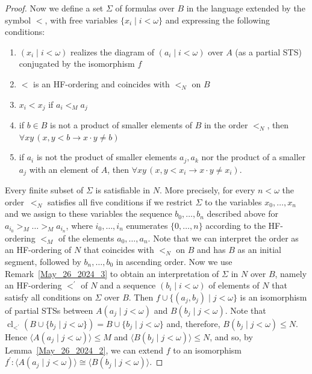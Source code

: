 \documentclass[a4paper, 11pt]{article}
\DeclareMathOperator{\cl}{cl}
\theoremstyle{note}
\begin{document}
\begin{proof}
	
	Now we define a set  $\Sigma$ of formulas over $B$ in  the language extended by the symbol $<$, with free variables $\{x_i\mid i<\omega\}$ and  expressing the following conditions:
	\begin{enumerate}
		\item $(x_i\mid i<\omega)$ realizes the diagram of $(a_i\mid i<\omega)$ over $A$ (as a partial STS) conjugated by the isomorphism $f$
		\item $<$ is an HF-ordering   and coincides with $<_N$ on $B$
		\item $x_i<x_j$  if  $a_i<_M a_j$
		\item if $b\in B$ is not a product of smaller elements of $B$ in the order $<_N$, then \\
		 $\forall xy \, (x,y<b\rightarrow x\cdot y\neq b)$
		\item if $a_i$ is not the product of smaller elements $a_j,  a_k$ nor the product of a smaller $a_j$ with an element of $A$, then  $\forall xy\, (x,y<x_i\rightarrow x\cdot y \neq x_i)$.
	\end{enumerate} Every finite subset of $\Sigma$ is satisfiable in $N$. More precisely, for every $n<\omega$   the order~$<_N$ satisfies all five conditions if we restrict $\Sigma$ to the variables $x_0,\ldots,x_n$ and we assign to these variables the sequence $b_0,\ldots,b_n$ described above for $a_{i_0}>_M \ldots >_M  a_{i_n}$,  where $i_0,\ldots,i_n$ enumerates  $\{0,\ldots,n\}$ according to the HF-ordering $<_M$ of the elements $a_0,\ldots,a_n$.
	 Note that we can interpret the order as an HF-ordering of $N$ that coincides with $<_N$ on $B$ and has $B$ as an initial segment, followed by $b_n,\ldots,b_0$ in ascending order.
	Now we use Remark~\ref{May_26_2024_3} to obtain an interpretation of $\Sigma$ in $N$ over $B$, namely an HF-ordering $<^\prime$ of $N$ and a sequence $(b_i\mid i <\omega)$ of elements of $N$ that satisfy all conditions on $\Sigma$ over $B$.  Then $f\cup\{(a_j,b_j)\mid j<\omega\}$ is an isomorphism of partial STSs between $A(a_j\mid j<\omega)$  and $B(b_j\mid j<\omega)$. Note that  $\cl_{<^\prime}(B\cup\{b_j\mid j<\omega\}) =B\cup \{b_j\mid j<\omega\}$  and, therefore,  $B(b_j\mid j<\omega)\leq N$. Hence $\langle A(a_j\mid j<\omega)\rangle \leq M$ and  $\langle B(b_j\mid j<\omega)\rangle \leq N$, and so, by Lemma~\ref{May_26_2024_2},  we can extend $f$ to an isomorphism $f^\prime:\langle A(a_j\mid j<\omega)\rangle \cong \langle B(b_j\mid j<\omega)\rangle$.
	
	

\end{proof}
\end{document}
